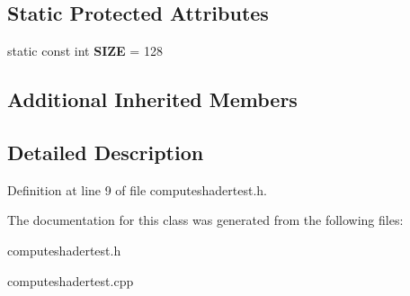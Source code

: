 \subsection*{Static Protected Attributes}
\begin{DoxyCompactItemize}
\item 
static const int {\bfseries S\-I\-Z\-E} = 128\label{classSoundfieldViewer_1_1ComputeShaderTest_ac1597a50035212b2d4c814c80c43fbdd}

\end{DoxyCompactItemize}
\subsection*{Additional Inherited Members}


\subsection{Detailed Description}


Definition at line 9 of file computeshadertest.\-h.



The documentation for this class was generated from the following files\-:\begin{DoxyCompactItemize}
\item 
computeshadertest.\-h\item 
computeshadertest.\-cpp\end{DoxyCompactItemize}
